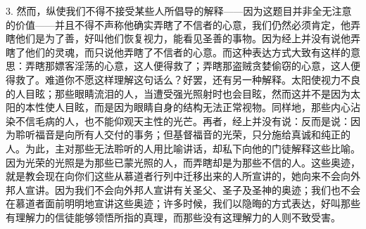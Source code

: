 3. 然而，纵使我们不得不接受某些人所倡导的解释——因为这题目并非全无注意的价值——并且不得不声称他确实弄瞎了不信者的心意，我们仍然必须肯定，他弄瞎他们是为了善，好叫他们恢复视力，能看见圣善的事物。因为经上并没有说他弄瞎了他们的灵魂，而只说他弄瞎了不信者的心意。而这种表达方式大致有这样的意思：弄瞎那嫖客淫荡的心意，这人便得救了；弄瞎那盗贼贪婪偷窃的心意，这人便得救了。难道你不愿这样理解这句话么？好罢，还有另一种解释。太阳使视力不良的人目眩；那些眼睛流泪的人，当遭受强光照射时也会目眩，然而这并不是因为太阳的本性使人目眩，而是因为眼睛自身的结构无法正常视物。同样地，那些内心沾染不信毛病的人，也不能仰观天主性的光芒。再者，经上并没有说：反而是说：因为聆听福音是向所有人交付的事务；但基督福音的光荣，只分施给真诚和纯正的人。为此，主对那些无法聆听的人用比喻讲话，却私下向他的门徒解释这些比喻。因为光荣的光照是为那些已蒙光照的人，而弄瞎却是为那些不信的人。这些奥迹，就是教会现在向你们这些从慕道者行列中迁移出来的人所宣讲的，她向来不会向外邦人宣讲。因为我们不会向外邦人宣讲有关圣父、圣子及圣神的奥迹；我们也不会在慕道者面前明明地宣讲这些奥迹；许多时候，我们以隐晦的方式表达，好叫那些有理解力的信徒能够领悟所指的真理，而那些没有这理解力的人则不致受害。\par

